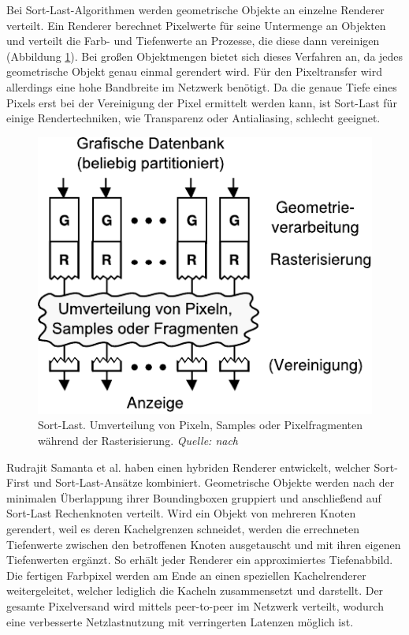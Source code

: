 Bei Sort-Last-Algorithmen werden geometrische Objekte an einzelne Renderer verteilt. Ein Renderer berechnet Pixelwerte für seine Untermenge an Objekten und verteilt die Farb- und Tiefenwerte an Prozesse, die diese dann vereinigen (Abbildung \ref{fig:relwork:sortlast}). Bei großen Objektmengen bietet sich dieses Verfahren an, da jedes geometrische Objekt genau einmal gerendert wird. Für den Pixeltransfer wird allerdings eine hohe Bandbreite im Netzwerk benötigt. Da die genaue Tiefe eines Pixels erst bei der Vereinigung der Pixel ermittelt werden kann, ist Sort-Last für einige Rendertechniken, wie Transparenz oder Antialiasing, schlecht geeignet.
\begin{figure}
 \centering
  \includegraphics[scale=0.8]{images/sort-last.pdf}
  \caption[Sort-Last]{Sort-Last. Umverteilung von Pixeln, Samples oder Pixelfragmenten während der Rasterisierung. \textit{Quelle: nach}}
 \label{fig:relwork:sortlast}
\end{figure}
Rudrajit Samanta et al. haben einen hybriden Renderer entwickelt, welcher Sort-First und Sort-Last-Ansätze kombiniert. Geometrische Objekte werden nach der minimalen Überlappung ihrer Boundingboxen gruppiert und anschließend auf Sort-Last Rechenknoten verteilt. Wird ein Objekt von mehreren Knoten gerendert, weil es deren Kachelgrenzen schneidet, werden die errechneten Tiefenwerte zwischen den betroffenen Knoten ausgetauscht und mit ihren eigenen Tiefenwerten ergänzt. So erhält jeder Renderer ein approximiertes Tiefenabbild. Die fertigen Farbpixel werden am Ende an einen speziellen Kachelrenderer weitergeleitet, welcher lediglich die Kacheln zusammensetzt und darstellt. Der gesamte Pixelversand wird mittels peer-to-peer im Netz\-werk verteilt, wodurch eine verbesserte Netzlastnutzung mit verringerten Latenzen möglich ist.


